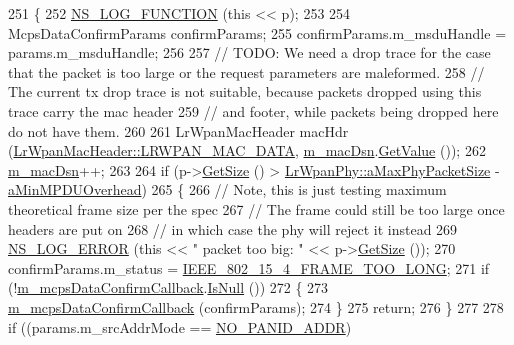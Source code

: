 \begin{DoxyCode}
251 \{
252   \hyperlink{log-macros-disabled_8h_a90b90d5bad1f39cb1b64923ea94c0761}{NS\_LOG\_FUNCTION} (\textcolor{keyword}{this} << p);
253 
254   McpsDataConfirmParams confirmParams;
255   confirmParams.m\_msduHandle = params.m\_msduHandle;
256 
257   \textcolor{comment}{// TODO: We need a drop trace for the case that the packet is too large or the request parameters are
       maleformed.}
258   \textcolor{comment}{//       The current tx drop trace is not suitable, because packets dropped using this trace carry the
       mac header}
259   \textcolor{comment}{//       and footer, while packets being dropped here do not have them.}
260 
261   LrWpanMacHeader macHdr (\hyperlink{classns3_1_1LrWpanMacHeader_a09363d4738e8ab00b82db8268b65d7a0a977c774a497fe1195b6c91c439e6b229}{LrWpanMacHeader::LRWPAN\_MAC\_DATA}, 
      \hyperlink{classns3_1_1LrWpanMac_a8a24e6d96342082f7b0343bdd0800d8c}{m\_macDsn}.\hyperlink{classns3_1_1SequenceNumber_ad1dc215eb95f5371596af8ec914d3e72}{GetValue} ());
262   \hyperlink{classns3_1_1LrWpanMac_a8a24e6d96342082f7b0343bdd0800d8c}{m\_macDsn}++;
263 
264   \textcolor{keywordflow}{if} (p->\hyperlink{classns3_1_1Packet_a462855c9929954d4301a4edfe55f4f1c}{GetSize} () > \hyperlink{classns3_1_1LrWpanPhy_a0dac53931aac7c959546ca54db5e39bb}{LrWpanPhy::aMaxPhyPacketSize} - 
      \hyperlink{classns3_1_1LrWpanMac_a49d8579fb79ba7a3a4eed04a375380c5}{aMinMPDUOverhead})
265     \{
266       \textcolor{comment}{// Note, this is just testing maximum theoretical frame size per the spec}
267       \textcolor{comment}{// The frame could still be too large once headers are put on}
268       \textcolor{comment}{// in which case the phy will reject it instead}
269       \hyperlink{group__logging_ga0261a8db1d4ac5f79417d117634fd455}{NS\_LOG\_ERROR} (\textcolor{keyword}{this} << \textcolor{stringliteral}{" packet too big: "} << p->\hyperlink{classns3_1_1Packet_a462855c9929954d4301a4edfe55f4f1c}{GetSize} ());
270       confirmParams.m\_status = \hyperlink{group__lr-wpan_gga50d67c8816b2ca8da8df30d045b1b705ab8d737a09f0b50d7c2dc000179e9e38d}{IEEE\_802\_15\_4\_FRAME\_TOO\_LONG};
271       \textcolor{keywordflow}{if} (!\hyperlink{classns3_1_1LrWpanMac_a05eba7a98d1cbbf86151290069e093e0}{m\_mcpsDataConfirmCallback}.\hyperlink{classns3_1_1Callback_aa8e27826badbf37f84763f36f70d9b54}{IsNull} ())
272         \{
273           \hyperlink{classns3_1_1LrWpanMac_a05eba7a98d1cbbf86151290069e093e0}{m\_mcpsDataConfirmCallback} (confirmParams);
274         \}
275       \textcolor{keywordflow}{return};
276     \}
277 
278   \textcolor{keywordflow}{if} ((params.m\_srcAddrMode == \hyperlink{group__lr-wpan_gga9ea4702ab11d5329e1593afebce06bbba9a46b3a665d4f92822cfa6080de87ab4}{NO\_PANID\_ADDR})

\end{DoxyCode}
